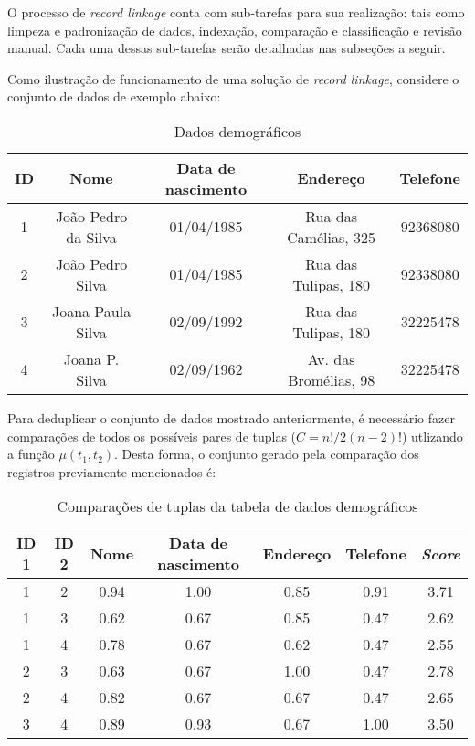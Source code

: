 \documentclass[
	12pt,				%
	openany,			%
	twoside,			%
	a4paper,			%
	brazil,				%
	]{unimontes-ppgmsc-abntex2}
\begin{document}
O processo de \textit{record linkage} conta com sub-tarefas para sua realização: tais como limpeza e padronização de dados, indexação, comparação e classificação e revisão manual. Cada uma dessas sub-tarefas serão detalhadas nas subseções a seguir.

Como ilustração de funcionamento de uma solução de \textit{record linkage}, considere o conjunto de dados de exemplo abaixo:

\begin{table}[!htpb]
    \centering
    \caption{Dados demográficos}
    \label{dataset}
    \begin{tabular}{|c|c|c|c|c|}
        \hline
        \textbf{ID} & \textbf{Nome} & \textbf{Data de nascimento} & \textbf{Endereço} & \textbf{Telefone} \\ \hline
        1 & João Pedro da Silva            & 01/04/1985                                   & Rua das Camélias, 325              & 92368080                           \\ \hline
        2 & João Pedro Silva               & 01/04/1985                                   & Rua das Tulipas, 180               & 92338080                           \\ \hline
        3 & Joana Paula Silva              & 02/09/1992                                   & Rua das Tulipas, 180               & 32225478                           \\ \hline
        4 & Joana P. Silva                 & 02/09/1962                                   & Av. das Bromélias, 98              & 32225478                           \\ \hline
    \end{tabular}
\end{table}

Para deduplicar o conjunto de dados mostrado anteriormente, é necessário fazer comparações de todos os possíveis pares de tuplas ($C = n!/2(n-2)!$) utlizando a função $\mu(t_1,t_2)$. Desta forma, o conjunto gerado pela comparação dos registros previamente mencionados é:

\begin{table}[!htpb]
    \centering
    \caption{Comparações de tuplas da tabela de dados demográficos}
    \label{comparacao}
    \begin{tabular}{|c|c|c|c|c|c|c|}
        \hline
        \textbf{ID 1} & \textbf{ID 2} & \textbf{Nome} & \textbf{Data de nascimento} & \textbf{Endereço} & \textbf{Telefone} & \textbf{\textit{Score}} \\ \hline
        1 & 2 & 0.94 & 1.00 & 0.85 & 0.91 & 3.71 \\ \hline
        1 & 3 & 0.62 & 0.67 & 0.85 & 0.47 & 2.62 \\ \hline
        1 & 4 & 0.78 & 0.67 & 0.62 & 0.47 & 2.55 \\ \hline
        2 & 3 & 0.63 & 0.67 & 1.00 & 0.47 & 2.78 \\ \hline
        2 & 4 & 0.82 & 0.67 & 0.67 & 0.47 & 2.65 \\ \hline
        3 & 4 & 0.89 & 0.93 & 0.67 & 1.00 & 3.50 \\ \hline
    \end{tabular}
\end{table}
\end{document}
